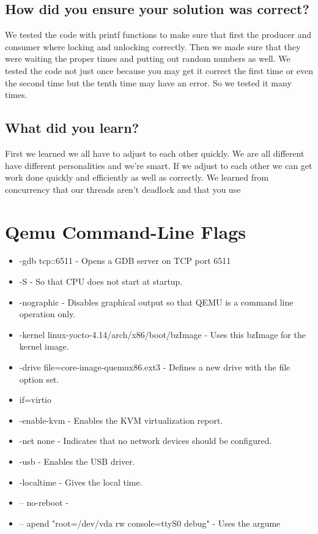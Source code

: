 \documentclass[draftclsnofoot,onecolumn,10pt,compsoc]{IEEEtran}
\begin{document}
\subsection{How did you ensure your solution was correct?}
We tested the code with printf functions to make sure that first the producer and consumer where locking and unlocking correctly.  Then we made sure that they were waiting the proper times and putting out random numbers as well.  We tested the code not just once because you may get it correct the first time or even the second time but the tenth time may have an error.  So we tested it many times.  
\subsection{What did you learn?}
First we learned we all have to adjust to each other quickly.  We are all different have different personalities and we're smart. If we adjust to each other we can get work done quickly and efficiently as well as correctly. We learned from concurrency that our threads aren't deadlock and that you use  
\section{Qemu Command-Line Flags}
\begin{itemize}
	\item -gdb tcp::6511 - Opens a GDB server on TCP port 6511
	\item -S - So that CPU does not start at startup.
	\item -nographic - Disables graphical output so that QEMU is a command line operation only.
	\item -kernel linux-yocto-4.14/arch/x86/boot/bzImage - Uses this bzImage for the kernel image.
	\item -drive file=core-image-quemux86.ext3 - Defines a new drive with the file option set.
	\item if=virtio
	\item -enable-kvm - Enables the KVM virtualization report.
	\item -net none - Indicates that no network devices should be configured.
	\item -usb - Enables the USB driver.
	\item -localtime - Gives the local time.
	\item -- no-reboot -
	\item -- apend "root=/dev/vda rw console=ttyS0 debug" - Uses the argume
\end{itemize}
\end{document}
